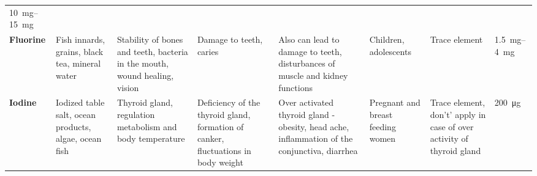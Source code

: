 \documentclass[../main.tex]{subfiles}
\begin{document}
\begin{sidewaystable}[p!]
\begin{small}
\begin{tabularx}{\textwidth}{p{1.2cm}p{2.5cm}p{3cm}p{3cm}p{2.3cm}p{2.5cm}p{3cm}p{1cm}}
    \SIrange{10}{15}{\mg} \\
    \textbf{Fluo\-rine}\index{mineral!fluorine} &
    Fish innards, grains, black tea, mineral water &
    Stability of bones and teeth, bacteria in the mouth, wound healing, vision &
    Damage to teeth, caries &
    Also can lead to damage to teeth, disturbances of muscle and kidney functions &
    Children, adolescents &
    Trace element &
    \SIrange{1.5}{4}{\mg} \\
    \textbf{Iod\-ine}\index{mineral!iodine} &
    Iodized table salt, ocean products, algae, ocean fish &
    Thyroid gland, regulation metabolism and body temperature &
    Deficiency of the thyroid gland, formation of canker, fluctuations in body weight &
    Over activated thyroid gland - obesity, head ache, inflammation of the conjunctiva, diarrhea &
    Pregnant and breast feeding women &
    Trace element, don't' apply in case of over activity of thyroid gland &
    \SI{200}{\micro\gram} \\
    \bottomrule
  \end{tabularx}
  \end{small}
  \end{sidewaystable}

\clearpage
\thispagestyle{empty}
\end{document}
